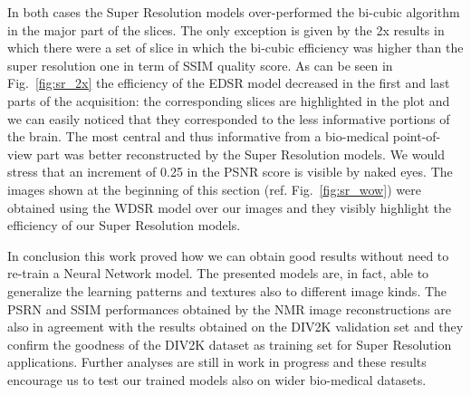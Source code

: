 \documentclass{standalone}
\begin{document}
In both cases the Super Resolution models over-performed the bi-cubic algorithm in the major part of the slices.
The only exception is given by the 2x results in which there were a set of slice in which the bi-cubic efficiency was higher than the super resolution one in term of SSIM quality score.
As can be seen in Fig.~\ref{fig:sr_2x} the efficiency of the EDSR model decreased in the first and last parts of the acquisition: the corresponding slices are highlighted in the plot and we can easily noticed that they corresponded to the less informative portions of the brain.
The most central and thus informative from a bio-medical point-of-view part was better reconstructed by the Super Resolution models.
We would stress that an increment of 0.25 in the PSNR score is visible by naked eyes.
The images shown at the beginning of this section (ref. Fig.~\ref{fig:sr_wow}) were obtained using the WDSR model over our images and they visibly highlight the efficiency of our Super Resolution models.

In conclusion this work proved how we can obtain good results without need to re-train a Neural Network model.
The presented models are, in fact, able to generalize the learning patterns and textures also to different image kinds.
The PSRN and SSIM performances obtained by the NMR image reconstructions are also in agreement with the results obtained on the DIV2K validation set and they confirm the goodness of the DIV2K dataset as training set for Super Resolution applications.
Further analyses are still in work in progress and these results encourage us to test our trained models also on wider bio-medical datasets.
\end{document}
